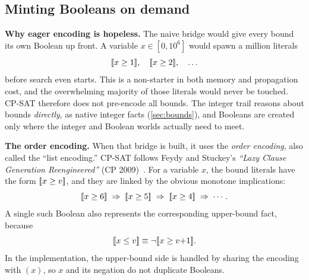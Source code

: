 \subsection{Minting Booleans on demand}\label{sec:encoding}

\textbf{Why eager encoding is hopeless.} The naive bridge would give every
bound its own Boolean up front. A variable $x \in [0, 10^6]$ would spawn a
million literals
\[
  [\![x \ge 1]\!],\quad
  [\![x \ge 2]\!],\quad
  \ldots
\]
before search even starts. This is a non-starter in both memory and propagation
cost, and the overwhelming majority of those literals would never be touched.
CP-SAT therefore does not pre-encode all bounds. The integer trail reasons
about bounds \emph{directly}, as native integer facts
(\cref{sec:bounds}), and Booleans are created only where the integer and
Boolean worlds actually need to meet.

\textbf{The order encoding.} When that bridge is built, it uses the
\emph{order encoding}, also called the ``list encoding.'' CP-SAT follows Feydy
and Stuckey's \emph{``Lazy Clause Generation Reengineered''} (CP
2009)~\cite{feydy2009lcg}.
For a variable $x$, the bound
literals have the form $[\![x \ge v]\!]$, and they are linked by
the obvious monotone implications:
\[
  [\![x \ge 6]\!] \;\Rightarrow\; [\![x \ge 5]\!]
  \;\Rightarrow\; [\![x \ge 4]\!] \;\Rightarrow\; \cdots .
\]
A single such Boolean also represents the corresponding upper-bound fact,
because
\[
  [\![x \le v]\!]
  \equiv
  \lnot[\![x \ge v{+}1]\!] .
\]
In the implementation, the upper-bound side is handled by sharing the encoding
with $(x)$, so $x$ and its negation do not duplicate Booleans.

